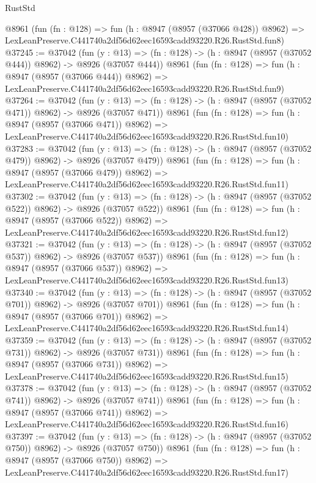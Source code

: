 \begin{lexlean}{RustStd}
\begin{coremodule}
    @8961
    (fun (fn : @128) =>
    fun (h : @8947 (@8957 (@37066 @428)) @8962) =>
    LexLeanPreserve.C441740a2df56d62eec16593cadd93220.R26.RustStd.fun8)
@37245 := @37042
    (fun (y : @13) => (fn : @128) -> (h : @8947 (@8957 (@37052 @444)) @8962) -> @8926 (@37057 @444))
    @8961
    (fun (fn : @128) =>
    fun (h : @8947 (@8957 (@37066 @444)) @8962) =>
    LexLeanPreserve.C441740a2df56d62eec16593cadd93220.R26.RustStd.fun9)
@37264 := @37042
    (fun (y : @13) => (fn : @128) -> (h : @8947 (@8957 (@37052 @471)) @8962) -> @8926 (@37057 @471))
    @8961
    (fun (fn : @128) =>
    fun (h : @8947 (@8957 (@37066 @471)) @8962) =>
    LexLeanPreserve.C441740a2df56d62eec16593cadd93220.R26.RustStd.fun10)
@37283 := @37042
    (fun (y : @13) => (fn : @128) -> (h : @8947 (@8957 (@37052 @479)) @8962) -> @8926 (@37057 @479))
    @8961
    (fun (fn : @128) =>
    fun (h : @8947 (@8957 (@37066 @479)) @8962) =>
    LexLeanPreserve.C441740a2df56d62eec16593cadd93220.R26.RustStd.fun11)
@37302 := @37042
    (fun (y : @13) => (fn : @128) -> (h : @8947 (@8957 (@37052 @522)) @8962) -> @8926 (@37057 @522))
    @8961
    (fun (fn : @128) =>
    fun (h : @8947 (@8957 (@37066 @522)) @8962) =>
    LexLeanPreserve.C441740a2df56d62eec16593cadd93220.R26.RustStd.fun12)
@37321 := @37042
    (fun (y : @13) => (fn : @128) -> (h : @8947 (@8957 (@37052 @537)) @8962) -> @8926 (@37057 @537))
    @8961
    (fun (fn : @128) =>
    fun (h : @8947 (@8957 (@37066 @537)) @8962) =>
    LexLeanPreserve.C441740a2df56d62eec16593cadd93220.R26.RustStd.fun13)
@37340 := @37042
    (fun (y : @13) => (fn : @128) -> (h : @8947 (@8957 (@37052 @701)) @8962) -> @8926 (@37057 @701))
    @8961
    (fun (fn : @128) =>
    fun (h : @8947 (@8957 (@37066 @701)) @8962) =>
    LexLeanPreserve.C441740a2df56d62eec16593cadd93220.R26.RustStd.fun14)
@37359 := @37042
    (fun (y : @13) => (fn : @128) -> (h : @8947 (@8957 (@37052 @731)) @8962) -> @8926 (@37057 @731))
    @8961
    (fun (fn : @128) =>
    fun (h : @8947 (@8957 (@37066 @731)) @8962) =>
    LexLeanPreserve.C441740a2df56d62eec16593cadd93220.R26.RustStd.fun15)
@37378 := @37042
    (fun (y : @13) => (fn : @128) -> (h : @8947 (@8957 (@37052 @741)) @8962) -> @8926 (@37057 @741))
    @8961
    (fun (fn : @128) =>
    fun (h : @8947 (@8957 (@37066 @741)) @8962) =>
    LexLeanPreserve.C441740a2df56d62eec16593cadd93220.R26.RustStd.fun16)
@37397 := @37042
    (fun (y : @13) => (fn : @128) -> (h : @8947 (@8957 (@37052 @750)) @8962) -> @8926 (@37057 @750))
    @8961
    (fun (fn : @128) =>
    fun (h : @8947 (@8957 (@37066 @750)) @8962) =>
    LexLeanPreserve.C441740a2df56d62eec16593cadd93220.R26.RustStd.fun17)

\end{coremodule}
\end{lexlean}
